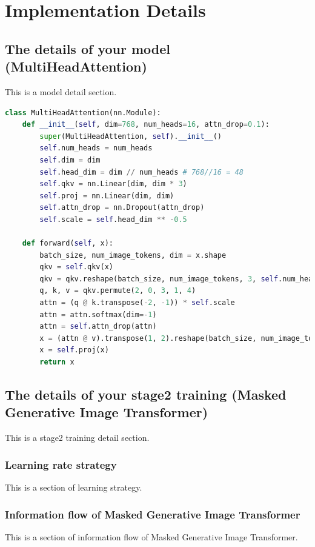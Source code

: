 \clearpage
\section{Implementation Details}

\subsection{The details of your model (MultiHeadAttention)}
This is a model detail section.
\begin{lstlisting}[language=Python, caption=Multi-Head Attention 實作]
class MultiHeadAttention(nn.Module):
    def __init__(self, dim=768, num_heads=16, attn_drop=0.1):
        super(MultiHeadAttention, self).__init__()
        self.num_heads = num_heads
        self.dim = dim
        self.head_dim = dim // num_heads # 768//16 = 48
        self.qkv = nn.Linear(dim, dim * 3)
        self.proj = nn.Linear(dim, dim)
        self.attn_drop = nn.Dropout(attn_drop)
        self.scale = self.head_dim ** -0.5

    def forward(self, x):
        batch_size, num_image_tokens, dim = x.shape
        qkv = self.qkv(x)
        qkv = qkv.reshape(batch_size, num_image_tokens, 3, self.num_heads, self.head_dim)
        q, k, v = qkv.permute(2, 0, 3, 1, 4)
        attn = (q @ k.transpose(-2, -1)) * self.scale 
        attn = attn.softmax(dim=-1)
        attn = self.attn_drop(attn)
        x = (attn @ v).transpose(1, 2).reshape(batch_size, num_image_tokens, dim)
        x = self.proj(x)
        return x
\end{lstlisting}


\subsection{The details of your stage2 training (Masked Generative Image Transformer)}
This is a stage2 training detail section.

\subsubsection{Learning rate strategy}
This is a section of learning strategy.





\subsubsection{Information flow of Masked Generative Image Transformer}
This is a section of information flow of Masked Generative Image Transformer.

